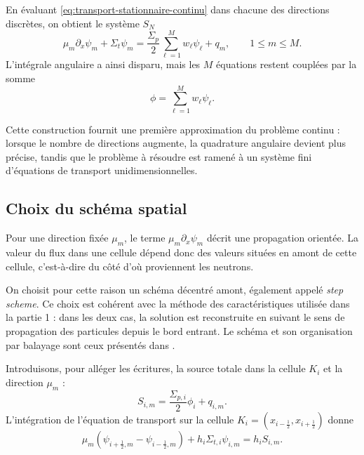 \documentclass{article}
\begin{document}
En évaluant \eqref{eq:transport-stationnaire-continu} dans chacune des directions discrètes, on obtient le système $S_N$
\begin{equation}
    \mu_m\partial_x\psi_m +\Sigma_t\psi_m
    = \frac{\Sigma_p}{2} \sum_{\ell=1}^{M}w_\ell\psi_\ell +q_m,
    \qquad 1\leq m\leq M.
    \label{eq:transport-SN-semi-discret}
\end{equation}
L'intégrale angulaire a ainsi disparu, mais les $M$ équations restent couplées par la somme
\[
\phi=\sum_{\ell=1}^{M}w_\ell\psi_\ell.
\]

Cette construction fournit une première approximation du problème continu : lorsque le nombre de directions augmente, la quadrature angulaire devient plus précise, tandis que le problème à résoudre est ramené à un système fini d'équations de transport unidimensionnelles.

\subsection {Choix du schéma spatial}

Pour une direction fixée $\mu_m$, le terme $\mu_m\partial_x\psi_m$ décrit une propagation orientée. La valeur du flux dans une cellule dépend donc des valeurs situées en amont de cette cellule, c'est-à-dire du côté d'où proviennent les neutrons.

On choisit pour cette raison un schéma décentré amont, également appelé \textit{step scheme}. Ce choix est cohérent avec la méthode des caractéristiques utilisée dans la partie 1 : dans les deux cas, la solution est reconstruite en suivant le sens de propagation des particules depuis le bord entrant. Le schéma et son organisation par balayage sont ceux présentés dans \cite[chap.~5, section~5.2.1]{Allaire2018}.

Introduisons, pour alléger les écritures, la source totale dans la
cellule $K_i$ et la direction $\mu_m$ :
\begin{equation}
    S_{i,m}
    =
    \frac{\Sigma_{p,i}}{2}\phi_i+q_{i,m}.
    \label{eq:source-totale-transport}
\end{equation}
L'intégration de l'équation de transport sur la cellule
$K_i=(x_{i-\frac12},x_{i+\frac12})$ donne
\begin{equation}
    \mu_m
    \left( \psi_{i+\frac12,m} - \psi_{i-\frac12,m} \right)
    + h_i\Sigma_{t,i}\psi_{i,m} 
    = h_iS_{i,m}.
    \label{eq:bilan-cellule-transport}
\end{equation}
\end{document}
